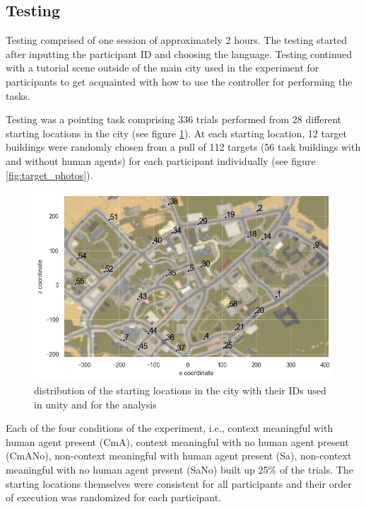 \subsection{Testing}

Testing comprised of one session of approximately 2 hours. The testing started after inputting the participant ID and choosing the language. Testing continued with a tutorial scene outside of the main city used in the experiment for participants to get acquainted with how to use the controller for performing the tasks. 

Testing was a pointing task comprising 336 trials performed from 28 different starting locations in the city (see figure \ref{fig:starting_locs}). At each starting location, 12 target buildings were randomly chosen from a pull of 112 targets (56 task buildings with and without human agents) for each participant individually (see figure \ref{fig:target_photos}). 

\begin{figure}[!htb]
	\raggedright
	\includegraphics[width=140mm]{figures/starting_locations_map_color_numbered.png}
	\caption[Distribution of starting locations]{distribution of the starting locations in the city with their IDs used in unity and for the analysis}
	\label{fig:starting_locs}
\end{figure}

Each of the four conditions of the experiment, i.e., context meaningful with human agent present {\emphasize(CmA)}, context meaningful with no human agent present {\emphasize(CmANo)}, non-context meaningful with human agent present {\emphasize(Sa)}, non-context meaningful with no human agent present {\emphasize(SaNo)} built up 25\% of the trials.  The starting locations themselves were consistent for all participants and their order of execution was randomized for each participant. 

